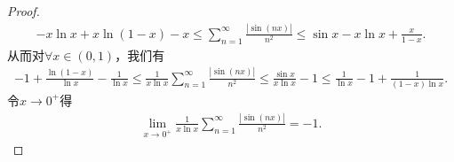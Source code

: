 \documentclass[../../main.tex]{subfiles}
\begin{document}
\begin{proof}
\begin{align*}
-x\ln x+x\ln \left( 1-x \right)-x\leqslant \sum_{n=1}^{\infty}\frac{|\sin(nx)|}{n^2}\leqslant \sin x-x\ln x+\frac{x}{1-x}.
\end{align*}
从而对$\forall x\in (0,1)$，我们有
\begin{align*}
-1+\frac{\ln \left( 1-x \right)}{\ln x}-\frac{1}{\ln x} \leqslant \frac{1}{x\ln x}\sum_{n=1}^{\infty}\frac{|\sin(nx)|}{n^2}\leqslant \frac{\sin x}{x\ln x}-1\leqslant \frac{1}{\ln x}-1+\frac{1}{(1-x)\ln x}.
\end{align*}
令$x\rightarrow 0^+$得
\begin{align*}
\lim_{x\rightarrow 0^+}\frac{1}{x\ln x}\sum_{n=1}^{\infty}\frac{|\sin(nx)|}{n^2}=-1.
\end{align*}

\end{proof}
\end{document}
